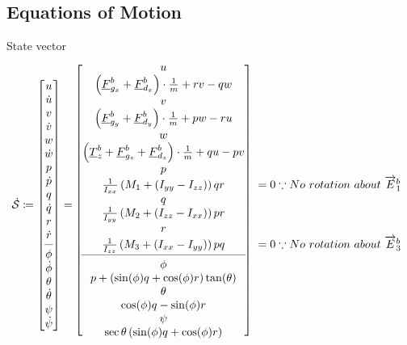 \subsection{Equations of Motion}
State vector \state
\[
\dot{\mstate} \coloneqq\begin{bmatrix}
u\\\dot{u}\\v\\\dot{v}\\w\\\dot{w}\\
p\\\dot{p}\\q\\\dot{q}\\r\\\dot{r}\\
\cmidrule(lr){1-1}
\phi\\\dot{\phi}\\\theta\\\dot{\theta}\\\psi\\\dot{\psi}
\end{bmatrix}=\begin{blockarray}{cl}
\begin{block}{[c]l}
u&\\\left(\colvec{F}_{g_x}^b+\colvec{F}_{d_x}^b\right)\cdot\frac{1}{m}+rv-qw&\\
v&\\\left(\colvec{F}_{g_y}^b+\colvec{F}_{d_y}^b\right)\cdot\frac{1}{m}+pw-ru&\\
w&\\\left(\colvec{T}^b_z+\colvec{F}_{g_z}^b+\colvec{F}_{d_z}^b\right)\cdot\frac{1}{m}+qu-pv&\\
p&\\\frac{1}{I_{xx}}\left(M_1+(I_{yy}-I_{zz})\right)qr&\mLabel{=0\because No\ rotation\ about\ \maxis{b}{1}}\\
q&\\\frac{1}{I_{yy}}\left(M_2+\left(I_{zz}-I_{xx}\right)\right)pr&\\
r&\\\frac{1}{I_{zz}}\left(M_3+\left(I_{xx}-I_{yy}\right)\right)pq&\mLabel{=0 \because No\ rotation\ about\ \maxis{b}{3}}\\
\cmidrule(lr){1-1}
\phi&\\p+\left(\sin(\phi)q+\cos(\phi)r\right)\tan(\theta)&\\
\theta&\\\cos(\phi)q-\sin(\phi)r&\\
\psi&\\\sec{\theta}\left(\sin(\phi)q+\cos(\phi)r\right)&\\
\end{block}
\end{blockarray}
\]
